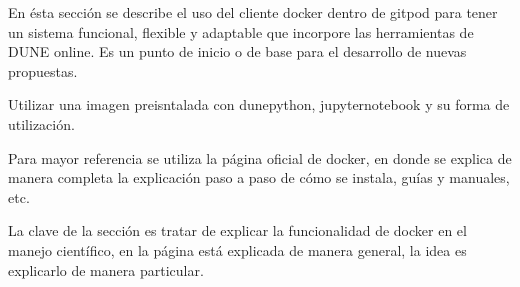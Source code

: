 En ésta sección se describe el uso del cliente docker dentro de gitpod
para tener un sistema funcional, flexible y adaptable que incorpore las herramientas de DUNE
online. Es un punto de inicio o de base para el desarrollo de nuevas propuestas.

Utilizar una imagen preisntalada con dunepython, jupyternotebook y su forma de utilización.

Para mayor referencia se utiliza la página oficial de docker, en donde se explica de manera 
completa la explicación paso a paso de cómo se instala, guías y manuales, etc.

La clave de la sección es tratar de explicar la funcionalidad de docker en el manejo científico,
en la página está explicada de manera general, la idea es explicarlo de manera particular.